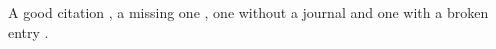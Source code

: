 \documentclass{article}
\begin{document}
A good citation \cite{knuth1984}, a missing one \cite{nosuchkey},
one without a journal \cite{nojournal}
and one with a broken entry \cite{broken}.



\end{document}
